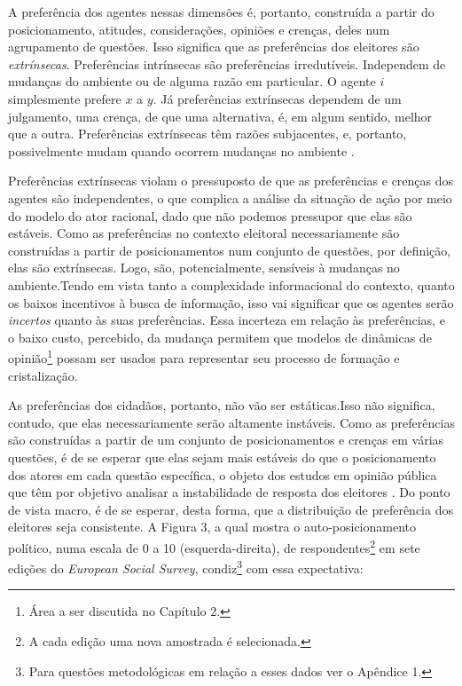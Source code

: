 A preferência dos agentes nessas dimensões é, portanto, construída a partir do
posicionamento, atitudes, considerações, opiniões e crenças, deles num
agrupamento de questões. Isso significa que as preferências dos eleitores são
\textit{extrínsecas}. Preferências intrínsecas são preferências irredutíveis.
Independem de mudanças do ambiente ou de alguma razão em particular. O agente
\(i\) simplesmente prefere \(x\) a \(y\). Já preferências extrínsecas dependem
de um julgamento, uma crença, de que uma alternativa, é, em algum sentido, melhor
que a outra. Preferências extrínsecas têm razões subjacentes, e, portanto,
possivelmente mudam quando ocorrem mudanças no ambiente \cite{liu2010wright,
  binmore2008rational}.

Preferências extrínsecas violam o pressuposto de que as preferências e crenças
dos agentes são independentes, o que complica a análise da situação de ação por
meio do modelo do ator racional, dado que não podemos pressupor que elas são
estáveis. Como as preferências no contexto eleitoral necessariamente são
construídas a partir de posicionamentos num conjunto de questões, por definição,
elas são extrínsecas. Logo, são, potencialmente, sensíveis à mudanças no
ambiente.Tendo em vista tanto a complexidade informacional do contexto, quanto
os baixos incentivos à busca de informação, isso vai significar que os agentes
serão \textit{incertos} quanto às suas preferências. Essa incerteza em relação
às preferências, e o baixo custo, percebido, da mudança permitem que modelos de
dinâmicas de opinião\footnote{Área a ser discutida no Capítulo 2.} possam ser
usados para representar seu processo de formação e cristalização.


As preferências dos cidadãos, portanto, não vão ser estáticas.Isso não
significa, contudo, que elas necessariamente serão altamente instáveis. Como
as preferências são construídas a partir de um conjunto de posicionamentos e
crenças em várias questões, é de se esperar que elas sejam mais estáveis do que
o posicionamento dos atores em cada questão específica, o objeto dos estudos em
opinião pública que têm por objetivo analisar a instabilidade de resposta dos
eleitores \cite{druckman2012public}. Do ponto de vista macro, é de se esperar,
desta forma, que a distribuição de preferência dos eleitores seja consistente. A
Figura 3, a qual mostra o auto-posicionamento político, numa escala de 0 a 10
(esquerda-direita), de respondentes\footnote{A cada edição uma nova amostrada é
  selecionada.} em sete edições do \textit{European Social Survey},
condiz\footnote{Para questões metodológicas em relação a esses dados ver o
  Apêndice 1.} com essa expectativa:


